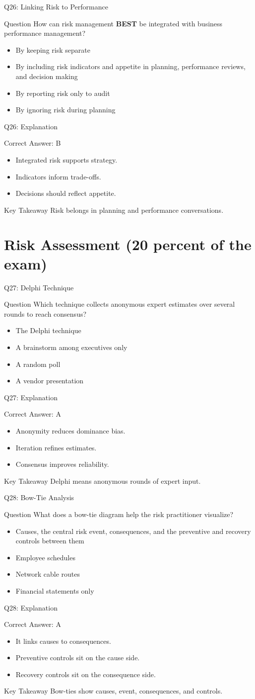 \documentclass[aspectratio=169]{beamer}
\newcommand{\hq}[7]{%
	\begin{frame}{Q#1: #2}
		\begin{block}{Question}
			#3
		\end{block}
		\begin{itemize}
			#4
		\end{itemize}
	\end{frame}
	\begin{frame}{Q#1: Explanation}
		\begin{block}{Correct Answer: #5}
			\begin{itemize}
				#6
			\end{itemize}
		\end{block}
		\begin{alertblock}{Key Takeaway}
			#7
		\end{alertblock}
	\end{frame}
}
\begin{document}
	\hq{26}{Linking Risk to Performance}
	{How can risk management \textbf{BEST} be integrated with business performance management?}
	{\item[\textbf{(A)}] By keeping risk separate
		\item[\textbf{(B)}] By including risk indicators and appetite in planning, performance reviews, and decision making
		\item[\textbf{(C)}] By reporting risk only to audit
		\item[\textbf{(D)}] By ignoring risk during planning}
	{B}
	{\item Integrated risk supports strategy.
		\item Indicators inform trade-offs.
		\item Decisions should reflect appetite.}
	{Risk belongs in planning and performance conversations.}

	\section{Risk Assessment (20 percent of the exam)}

	\hq{27}{Delphi Technique}
	{Which technique collects anonymous expert estimates over several rounds to reach consensus?}
	{\item[\textbf{(A)}] The Delphi technique
		\item[\textbf{(B)}] A brainstorm among executives only
		\item[\textbf{(C)}] A random poll
		\item[\textbf{(D)}] A vendor presentation}
	{A}
	{\item Anonymity reduces dominance bias.
		\item Iteration refines estimates.
		\item Consensus improves reliability.}
	{Delphi means anonymous rounds of expert input.}

	\hq{28}{Bow-Tie Analysis}
	{What does a bow-tie diagram help the risk practitioner visualize?}
	{\item[\textbf{(A)}] Causes, the central risk event, consequences, and the preventive and recovery controls between them
		\item[\textbf{(B)}] Employee schedules
		\item[\textbf{(C)}] Network cable routes
		\item[\textbf{(D)}] Financial statements only}
	{A}
	{\item It links causes to consequences.
		\item Preventive controls sit on the cause side.
		\item Recovery controls sit on the consequence side.}
	{Bow-ties show causes, event, consequences, and controls.}
\end{document}
